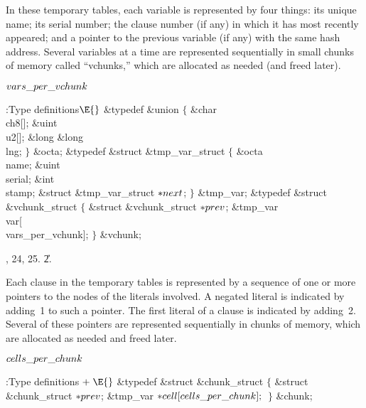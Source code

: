 In these temporary tables, each variable is represented by four things:
its unique name; its serial number; the clause number (if any) in which it has
most recently appeared; and a pointer to the previous variable (if any)
with the same hash address. Several variables at a time
are represented sequentially in small chunks of memory called ``vchunks,''
which are allocated as needed (and freed later).

\Y\B\4\D$\\{vars\_per\_vchunk}$ \5
\par
\Y\B\4:Type definitions\X${}\E{}$\6
\&{typedef} \&{union} ${}\{{}$\1\6
\&{char} \\{ch8}[];\6
\&{uint} \\{u2}[];\6
\&{long} \&{long} \\{lng};\2\6
${}\}{}$ \&{octa};\6
\&{typedef} \&{struct} \&{tmp\_var\_struct} ${}\{{}$\1\6
\&{octa} \\{name};\6
\&{uint} \\{serial};\6
\&{int} \\{stamp};\6
\&{struct} \&{tmp\_var\_struct} ${}{*}\\{next}{}$;\2%
\6
${}\}{}$ \&{tmp\_var};\7
\&{typedef} \&{struct} \&{vchunk\_struct} ${}\{{}$\1\6
\&{struct} \&{vchunk\_struct} ${}{*}\\{prev}{}$;\6
\&{tmp\_var} \\{var}[\\{vars\_per\_vchunk}];\2\6
${}\}{}$ \&{vchunk};\par
{}, 24, 25.
\U2.\fi

Each clause in the temporary tables is represented by a
sequence of
one or more pointers to the  nodes of the literals involved.
A negated literal is indicated by adding~1 to such a pointer.
The first literal of a clause is indicated by adding~2.
Several of these pointers are represented sequentially in chunks
of memory, which are allocated as needed and freed later.

\Y\B\4\D$\\{cells\_per\_chunk}$ \5
\par
\Y\B\4:Type definitions\X${}\mathrel+\E{}$\6
\&{typedef} \&{struct} \&{chunk\_struct} ${}\{{}$\1\6
\&{struct} \&{chunk\_struct} ${}{*}\\{prev}{}$;\6
\&{tmp\_var} ${}{*}\\{cell}[\\{cells\_per\_chunk}];{}$\2\6
${}\}{}$ \&{chunk};\par
\fi

